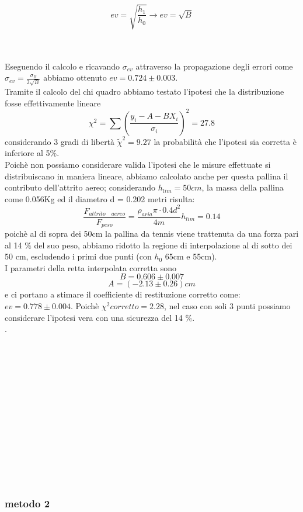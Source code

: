 \documentclass[a4paper]{article}
\theoremstyle{definition}
\begin{document}
	\[ev = \sqrt{\frac{h_{1}}{h_{0}}} \rightarrow ev = \sqrt{B}\]
	
	\\\\
	Eseguendo il calcolo e ricavando \(\sigma_{ev}\) attraverso la propagazione degli errori come \(\sigma _{ev} = \frac{\sigma _{B}}{2\sqrt{B}}\) abbiamo ottenuto \(ev = 0.724 \pm 0.003\).\\
	\noindent Tramite il calcolo del chi quadro abbiamo testato l'ipotesi che la distribuzione fosse effettivamente lineare
	\[\chi ^{2} = \sum \left ( \frac{y_{i}-A-BX_{i}}{\sigma_{i}} \right )^{2} = 27.8\]
	\noindent considerando 3 gradi di libertà \(\tilde{\chi}^{2} = 9.27 \) la probabilità che l'ipotesi sia corretta è inferiore al 5\(\%\).\\
	Poichè non possiamo considerare valida l'ipotesi che le misure effettuate si distribuiscano in maniera lineare, abbiamo calcolato anche per questa pallina il contributo dell'attrito aereo; considerando \(h_{lim} = 50 cm\), la massa della pallina come 0.056Kg ed il diametro d = 0.202 metri risulta:
	\[\frac{F_{attrito \quad aereo}}{F_{peso}} = \frac{\rho_{aria} \pi \cdot 0.4 d^{2}}{4m}h_{lim} =  0.14\]
	poichè al di sopra dei 50cm la pallina da tennis viene trattenuta da una forza pari al 14 \(\%\) del suo peso, abbiamo ridotto la regione di interpolazione al di sotto dei 50 cm, escludendo i primi due punti (con \(h_{0}\) 65cm e 55cm).\\
	I parametri della retta interpolata corretta sono
	\[B =0.606 \pm 0.007\]
	\[A =(-2.13 \pm 0.26) cm\]
	e ci portano a stimare il coefficiente di restituzione corretto come: \(ev =  0.778 \pm 0.004\). Poichè \(\chi ^{2}corretto = 2.28\), nel caso con soli 3 punti possiamo considerare l'ipotesi vera con una sicurezza del 14 \(\%\).\\
.\\\\\\\\\\\\\\\\\\\\\\\\\\\\
	\subsubsection*{metodo 2}
	
\end{document}

